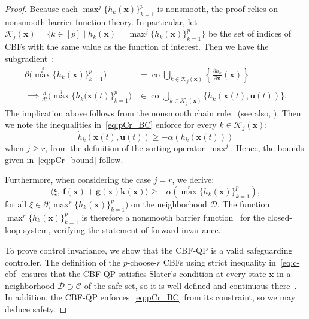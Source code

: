 \documentclass[journal,twoside,web]{ieeecolor}
\newcommand{\until}[1]{[#1]}
\newcommand{\setdefb}[2]{\big\{#1 \; | \; #2\big\}}
\newcommand{\Cc}{\mathcal{C}}
\newcommand{\Dc}{\mathcal{D}}
\newcommand{\Kc}{\mathcal{K}}
\theoremstyle{definition}
\renewcommand{\bf}{\mathbf{f}} %
\newcommand{\bg}{\mathbf{g}}
\newcommand{\bk}{\mathbf{k}}
\newcommand{\bu}{\mathbf{u}}
\newcommand{\bx}{\mathbf{x}}
\newcommand{\co}{{\operatorname{co}}}
\begin{document}
\begin{proof}
    Because each $\max^j\{h_k(\bx)\}_{k=1}^p$ is nonsmooth, the proof relies on nonsmooth barrier function theory. In particular, let $\Kc_j(\bx) = \setdefb{k\in\until p}{h_k(\bx) = \max^j\{h_k(\bx)\}_{k=1}^p}$ be the set of indices of CBFs with the same value as the function of interest.
    Then we have the subgradient~\cite{FHC:83}:
    \begin{align*}
    \partial \big(\max^j\{h_k(\bx)\}_{k=1}^p\big) &= \co\bigcup_{k\in\Kc_j(\bx)} \left\{\frac{\partial h_k}{\partial \bx}(\bx)\right\} \\
    \implies \frac{d}{dt} \big(\max^j\{h_k(\bx(t)\}_{k=1}^p\big)&\in \co\bigcup_{k\in\Kc_j(\bx)}\{\dot h_k(\bx(t),\bu(t))\}.
    \end{align*}
    The implication above follows from the nonsmooth chain rule~\cite[Thm. 2.3.10]{FHC:83} (see also, \cite{PG-JC-ME:17}).
    Then we note the inequalities in~\eqref{eq:pCr_BC} enforce for every $k\in\Kc_j(\bx)$:
    $$
    \dot h_k(\bx(t),\bu(t)) \geq -\alpha(h_k(\bx(t)))
    $$
    when $j\geq r$, from the definition of the sorting operator $\max^j$. Hence, the bounds given in~\eqref{eq:pCr_bound} follow. 
    
    Furthermore, when considering the case $j=r$, we derive:
    $$
    \langle\xi,~\bf(\bx)+\bg(\bx)\bk(\bx)\rangle \geq -\alpha(\max^r\{h_k(\bx)\}_{k=1}^p), 
    $$
    for all $\xi \in \partial\big(\max^r\{h_k(\bx)\}_{k=1}^p\big)$ on the neighborhood $\Dc$. The function $\max^r\{h_k(\bx)\}_{k=1}^p$ is therefore a nonsmooth barrier function~\cite[Prop. 2]{PG-JC-ME:17} for the closed-loop system, verifying the statement of forward invariance.
    
    To prove control invariance, we show that the CBF-QP is a valid safeguarding controller. The definition of the $p$-choose-$r$ CBFs using strict inequality in~\eqref{eq:c-cbf} ensures that the CBF-QP satisfies Slater's condition at every state $\bx$ in a neighborhood $\Dc\supset \Cc$ of the safe set, so it is well-defined and continuous there~\cite{PM-AA-JC:25}. In addition, the CBF-QP enforces~\eqref{eq:pCr_BC} from its constraint, so we may deduce safety.
\end{proof}
\end{document}
